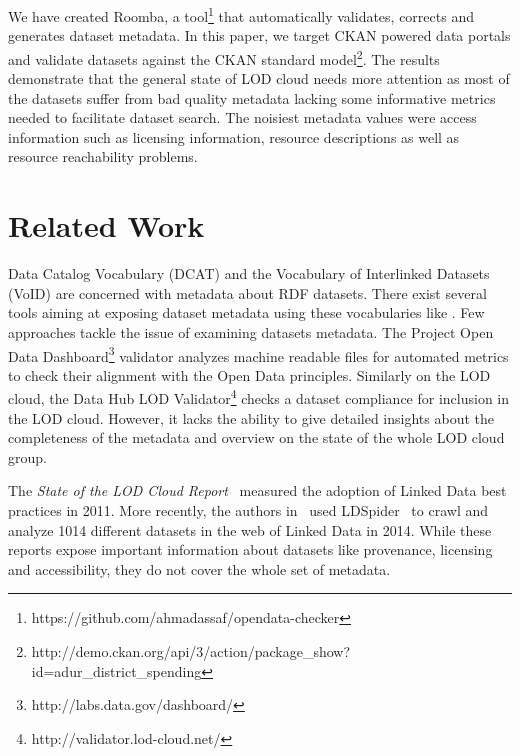 \documentclass[runningheads,a4paper]{llncs}
\begin{document}
We have created Roomba, a tool\footnote{https://github.com/ahmadassaf/opendata-checker} that automatically validates, corrects and generates dataset metadata. In this paper, we target CKAN powered data portals and validate datasets against the CKAN standard model\footnote{http://demo.ckan.org/api/3/action/package\_show?id=adur\_district\_spending}. The results demonstrate that the general state of LOD cloud needs more attention as most of the datasets suffer from bad quality metadata lacking some informative metrics needed to facilitate dataset search. The noisiest metadata values were access information such as licensing information, resource descriptions as well as resource reachability problems.


\section{Related Work}
\label{sec:related-work}

Data Catalog Vocabulary (DCAT) \cite{Erickson:14:DCV} and the Vocabulary of Interlinked Datasets (VoID) \cite{Cyganiak:11:DLD} are concerned with metadata about RDF datasets. There exist several tools aiming at exposing dataset metadata using these vocabularies like \cite{BoHm:2011:CVD:2030805.2031001}.
Few approaches tackle the issue of examining datasets metadata. The Project Open Data Dashboard\footnote{http://labs.data.gov/dashboard/} validator analyzes machine readable files for automated metrics to check their alignment with the Open Data principles. Similarly on the LOD cloud, the Data Hub LOD Validator\footnote{http://validator.lod-cloud.net/} checks a dataset compliance for inclusion in the LOD cloud. However, it lacks the ability to give detailed insights about the completeness of the metadata and overview on the state of the whole LOD cloud group.

The \textit{State of the LOD Cloud Report}~\cite{SOLOD} measured the adoption of Linked Data best practices in 2011. More recently, the authors in~\cite{DBLP:conf/semweb/SchmachtenbergBP14} used LDSpider~\cite{conf/semweb/IseleUBH10} to crawl and analyze 1014 different datasets in the web of Linked Data in 2014. While these reports expose important information about datasets like provenance, licensing and accessibility, they do not cover the whole set of metadata.

\end{document}
